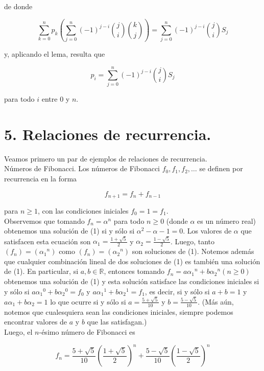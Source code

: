 \documentclass[10pt]{article}
\begin{document}
de donde

$$
\sum_{k=0}^{n} p_{k}\left(\sum_{j=0}^{n}(-1)^{j-i}\binom{j}{i}\binom{k}{j}\right)=\sum_{j=0}^{n}(-1)^{j-i}\binom{j}{i} S_{j}
$$

y, aplicando el lema, resulta que

$$
p_{i}=\sum_{j=0}^{n}(-1)^{j-i}\binom{j}{i} S_{j}
$$

para todo $i$ entre 0 y $n$.

\section*{5. Relaciones de recurrencia.}
Veamos primero un par de ejemplos de relaciones de recurrencia.\\
Números de Fibonacci. Los números de Fibonacci $f_{0}, f_{1}, f_{2}, \ldots$ se definen por recurrencia en la forma


\begin{equation*}
f_{n+1}=f_{n}+f_{n-1} \tag{1}
\end{equation*}


para $n \geq 1$, con las condiciones iniciales $f_{0}=1=f_{1}$.\\
Observemos que tomando $f_{n}=\alpha^{n}$ para todo $n \geq 0$ (donde $\alpha$ es un número real) obtenemos una solución de (1) si y sólo si $\alpha^{2}-\alpha-1=0$. Los valores de $\alpha$ que satisfacen esta ecuación son $\alpha_{1}=\frac{1+\sqrt{5}}{2}$ y $\alpha_{2}=\frac{1-\sqrt{5}}{2}$. Luego, tanto $\left(f_{n}\right)=\left(\alpha_{1}{ }^{n}\right)$ como $\left(f_{n}\right)=\left(\alpha_{2}{ }^{n}\right)$ son soluciones de (1). Notemos además que cualquier combinación lineal de dos soluciones de (1) es también una solución de (1). En particular, si $a, b \in \mathbb{R}$, entonces tomando $f_{n}=a \alpha_{1}{ }^{n}+b \alpha_{2}{ }^{n}(n \geq 0)$ obtenemos una solución de (1) y esta solución satisface las condiciones iniciales si y sólo si $a \alpha_{1}{ }^{0}+b \alpha_{2}{ }^{0}=f_{0}$ y $a \alpha_{1}{ }^{1}+b \alpha_{2}{ }^{1}=f_{1}$, es decir, si y sólo si $a+b=1$ y $a \alpha_{1}+b \alpha_{2}=1$ lo que ocurre si y sólo si $a=\frac{5+\sqrt{5}}{10}$ y $b=\frac{5-\sqrt{5}}{10}$. (Más aún, notemos que cualesquiera sean las condiciones iniciales, siempre podemos encontrar valores de $a$ y $b$ que las satisfagan.)\\
Luego, el $n$-ésimo número de Fibonacci es

$$
f_{n}=\frac{5+\sqrt{5}}{10}\left(\frac{1+\sqrt{5}}{2}\right)^{n}+\frac{5-\sqrt{5}}{10}\left(\frac{1-\sqrt{5}}{2}\right)^{n}
$$
\end{document}
